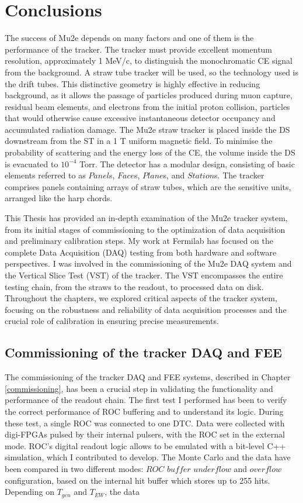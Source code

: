 \chapter{Conclusions}\label{conclusions}
The success of Mu2e depends on many factors and one of them is the 
performance of the tracker. 
The tracker must provide excellent momentum resolution, approximately 1 MeV/c, 
to distinguish the monochromatic CE signal from the background. 
A straw tube tracker will be used, so the 
technology used is the drift tubes. This distinctive geometry 
is highly effective in reducing background, as it allows 
the passage of particles produced during muon capture, 
residual beam elements, and electrons from the initial proton collision, 
particles that would otherwise cause excessive instantaneous detector 
occupancy and accumulated radiation damage. The Mu2e straw tracker is placed inside the DS downstream from 
the ST in a 1 T uniform magnetic field. To minimise the probability of scattering and the energy loss of the CE, 
the volume inside the DS is evacuated to $10^{-4}$ Torr. The detector has a modular design, consisting 
of basic elements referred to as $Panel$s, $Face$s, $Plane$s, and $Station$s. The 
tracker comprises panels containing arrays of straw tubes, which are the 
sensitive units, arranged like the harp chords.

This Thesis has provided an in-depth examination of the Mu2e 
tracker system, from its initial stages of commissioning to the 
optimization of data acquisition and preliminary calibration steps. 
My work at Fermilab has focused on the 
complete Data Acquisition (DAQ) testing from both hardware and software 
perspectives. I was involved in the commissioning of the Mu2e DAQ system and 
the Vertical Slice Test (VST) of the tracker. The VST encompasses the entire 
testing chain, from the straws to the readout, to processed data on disk.
Throughout the chapters, we explored critical aspects of the tracker 
system, focusing on the robustness and reliability of data acquisition 
processes and the crucial role of calibration in ensuring precise measurements. 

\section{Commissioning of the tracker DAQ and FEE}

The commissioning of the tracker DAQ and FEE systems, described in Chapter \ref{commissioning}, has been a 
crucial step in validating the functionality and performance of the 
readout chain. 
The first test I performed has been to verify the correct performance of ROC 
buffering and to understand its logic. During these test, a single ROC was connected to one DTC. Data were collected
with digi-FPGAs pulsed by their internal pulsers, with the ROC set in the external
mode. ROC's digital readout logic allows to be emulated with a bit-level C++ simulation,
which I contributed to develop. The Monte Carlo and the data have been compared in two different 
modes: $ROC$ $buffer$ $underflow$ and $overflow$ configuration, based on the internal hit buffer 
which stores up to 255 hits. Depending on $T_{gen}$ and $T_{EW}$, the data 

